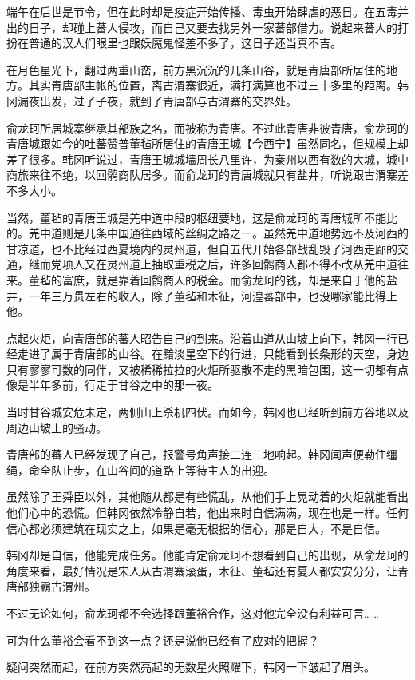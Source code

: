 端午在后世是节令，但在此时却是疫症开始传播、毒虫开始肆虐的恶日。在五毒并出的日子，却碰上蕃人侵攻，而自己又要去找另外一家蕃部借力。说起来蕃人的打扮在普通的汉人们眼里也跟妖魔鬼怪差不多了，这日子还当真不吉。

在月色星光下，翻过两重山峦，前方黑沉沉的几条山谷，就是青唐部所居住的地方。其实青唐部主帐的位置，离古渭寨很近，满打满算也不过三十多里的距离。韩冈漏夜出发，过了子夜，就到了青唐部与古渭寨的交界处。

俞龙珂所居城寨继承其部族之名，而被称为青唐。不过此青唐非彼青唐，俞龙珂的青唐城跟如今的吐蕃赞普董毡所居住的青唐王城【今西宁】虽然同名，但规模上却差了很多。韩冈听说过，青唐王城城墙周长八里许，为秦州以西有数的大城，城中商旅来往不绝，以回鹘商队居多。而俞龙珂的青唐城就只有盐井，听说跟古渭寨差不多大小。

当然，董毡的青唐王城是羌中道中段的枢纽要地，这是俞龙珂的青唐城所不能比的。羌中道则是几条中国通往西域的丝绸之路之一。虽然羌中道地势远不及河西的甘凉道，也不比经过西夏境内的灵州道，但自五代开始各部战乱毁了河西走廊的交通，继而党项人又在灵州道上抽取重税之后，许多回鹘商人都不得不改从羌中道往来。董毡的富庶，就是靠着回鹘商人的税金。而俞龙珂的钱，却是来自于他的盐井，一年三万贯左右的收入，除了董毡和木征，河湟蕃部中，也没哪家能比得上他。

点起火炬，向青唐部的蕃人昭告自己的到来。沿着山道从山坡上向下，韩冈一行已经走进了属于青唐部的山谷。在黯淡星空下的行进，只能看到长条形的天空，身边只有寥寥可数的同伴，又被稀稀拉拉的火炬所驱散不走的黑暗包围，这一切都有点像是半年多前，行走于甘谷之中的那一夜。

当时甘谷城安危未定，两侧山上杀机四伏。而如今，韩冈也已经听到前方谷地以及周边山坡上的骚动。

青唐部的蕃人已经发现了自己，报警号角声接二连三地响起。韩冈闻声便勒住缰绳，命全队止步，在山谷间的道路上等待主人的出迎。

虽然除了王舜臣以外，其他随从都是有些慌乱，从他们手上晃动着的火炬就能看出他们心中的恐慌。但韩冈依然冷静自若，他出来时自信满满，现在也是一样。任何信心都必须建筑在现实之上，如果是毫无根据的信心，那是自大，不是自信。

韩冈却是自信，他能完成任务。他能肯定俞龙珂不想看到自己的出现，从俞龙珂的角度来看，最好情况是宋人从古渭寨滚蛋，木征、董毡还有夏人都安安分分，让青唐部独霸古渭州。

不过无论如何，俞龙珂都不会选择跟董裕合作，这对他完全没有利益可言……

可为什么董裕会看不到这一点？还是说他已经有了应对的把握？

疑问突然而起，在前方突然亮起的无数星火照耀下，韩冈一下皱起了眉头。

